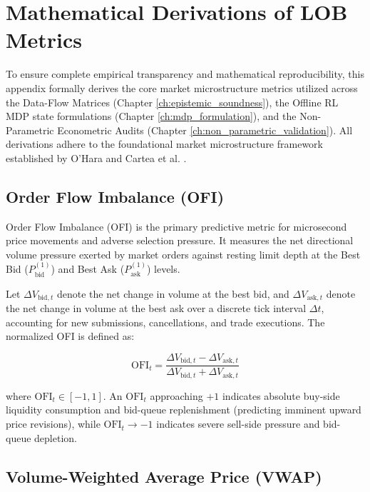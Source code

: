 \chapter{Mathematical Derivations of LOB Metrics}
\label{app:math_derivations}

To ensure complete empirical transparency and mathematical reproducibility, this appendix formally derives the core market microstructure metrics utilized across the Data-Flow Matrices (Chapter \ref{ch:epistemic_soundness}), the Offline RL MDP state formulations (Chapter \ref{ch:mdp_formulation}), and the Non-Parametric Econometric Audits (Chapter \ref{ch:non_parametric_validation}). All derivations adhere to the foundational market microstructure framework established by O'Hara \cite{ohara1995market} and Cartea et al. \cite{cartea2015algorithmic}.

\section{Order Flow Imbalance (OFI)}

Order Flow Imbalance (OFI) is the primary predictive metric for microsecond price movements and adverse selection pressure. It measures the net directional volume pressure exerted by market orders against resting limit depth at the Best Bid ($P_{\text{bid}}^{(1)}$) and Best Ask ($P_{\text{ask}}^{(1)}$) levels.

Let $\Delta V_{\text{bid}, t}$ denote the net change in volume at the best bid, and $\Delta V_{\text{ask}, t}$ denote the net change in volume at the best ask over a discrete tick interval $\Delta t$, accounting for new submissions, cancellations, and trade executions. The normalized OFI is defined as:

\begin{equation}
    \text{OFI}_t = \frac{\Delta V_{\text{bid}, t} - \Delta V_{\text{ask}, t}}{\Delta V_{\text{bid}, t} + \Delta V_{\text{ask}, t}}
\end{equation}

where $\text{OFI}_t \in [-1, 1]$. An $\text{OFI}_t$ approaching $+1$ indicates absolute buy-side liquidity consumption and bid-queue replenishment (predicting imminent upward price revisions), while $\text{OFI}_t \to -1$ indicates severe sell-side pressure and bid-queue depletion.

\section{Volume-Weighted Average Price (VWAP)}

